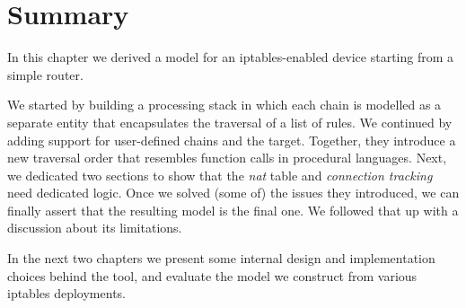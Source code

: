 \section{Summary}
In this chapter we derived a model for an iptables-enabled device starting from
a simple router.

We started by building a processing stack in which each chain is modelled as a
separate entity that encapsulates the traversal of a list of rules.  We
continued by adding support for user-defined chains and the \RETURN target.
Together, they introduce a new traversal order that resembles function calls in
procedural languages.  Next, we dedicated two sections to show that the
\emph{nat} table and \emph{connection tracking} need dedicated logic.  Once we
solved (some of) the issues they introduced, we can finally assert that the
resulting model is the final one.  We followed that up with a discussion about
its limitations.

In the next two chapters we present some internal design and implementation
choices behind the \TOOL tool, and evaluate the model we construct from various
iptables deployments.
